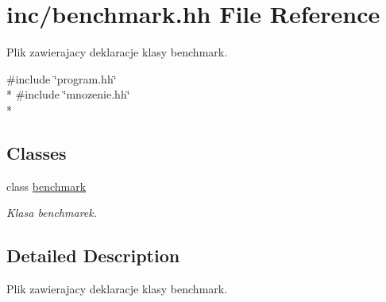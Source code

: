 \hypertarget{benchmark_8hh}{\section{inc/benchmark.hh File Reference}
\label{benchmark_8hh}
}


Plik zawierajacy deklaracje klasy benchmark.  


{\ttfamily \#include \char`\"{}program.\-hh\char`\"{}}\\*
{\ttfamily \#include \char`\"{}mnozenie.\-hh\char`\"{}}\\*
\subsection*{Classes}
\begin{DoxyCompactItemize}
\item 
class \hyperlink{classbenchmark}{benchmark}
\begin{DoxyCompactList}\small\item\em Klasa benchmarek. \end{DoxyCompactList}\end{DoxyCompactItemize}


\subsection{Detailed Description}
Plik zawierajacy deklaracje klasy benchmark. 